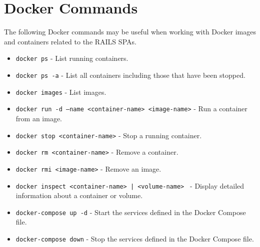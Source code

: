 \chapter{Docker Commands}
\label{app:dockercommands}
The following Docker commands may be useful when working with Docker images and containers related to the \ac{RAILS} \acp{SPA}.
\begin{itemize}
    \item \texttt{docker ps} - List running containers.
    \item \texttt{docker ps -a} - List all containers including those that have been stopped.
    \item \texttt{docker images} - List images.
    \item \texttt{docker run -d --name <container-name> <image-name>} - Run a container from an image.
    \item \texttt{docker stop <container-name>} - Stop a running container.
    \item \texttt{docker rm <container-name>} - Remove a container.
    \item \texttt{docker rmi <image-name>} - Remove an image.
    \item \texttt{docker inspect <container-name> | <volume-name> } - Display detailed information about a container or volume.
    \item \texttt{docker-compose up -d} - Start the services defined in the Docker Compose file.
    \item \texttt{docker-compose down} - Stop the services defined in the Docker Compose file.
\end{itemize}